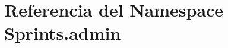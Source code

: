 \hypertarget{namespace_sprints_1_1admin}{}\section{Referencia del Namespace Sprints.\+admin}
\label{namespace_sprints_1_1admin}
